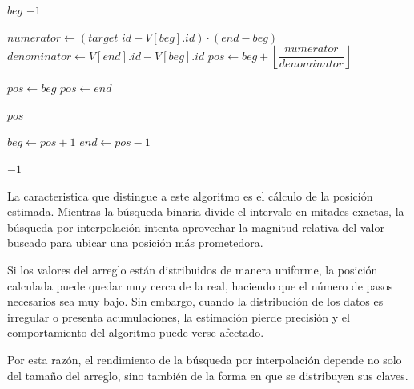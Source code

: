\begin{algorithm}
    \caption{Búsqueda por interpolación $\triangleright$ $V[beg..end]$}
    \begin{algorithmic}[1]


                    \State \Return $beg$
                \EndIf
                \State \Return $-1$
            \EndIf

            \State $numerator \gets (target\_id - V[beg].id) \cdot (end - beg)$
            \State $denominator \gets V[end].id - V[beg].id$
            \State $pos \gets beg + \left\lfloor \dfrac{numerator}{denominator} \right\rfloor$

                \State $pos \gets beg$
                \State $pos \gets end$
            \EndIf

                \State \Return $pos$
            \EndIf

                \State $beg \gets pos + 1$
            \Else
                \State $end \gets pos - 1$
            \EndIf

        \EndWhile

        \State \Return $-1$

        \EndProcedure
    \end{algorithmic}
\end{algorithm}

La caracteristica que distingue a este algoritmo es el cálculo de la posición estimada. Mientras la búsqueda binaria divide el intervalo en mitades exactas, la búsqueda por interpolación intenta aprovechar la magnitud relativa del valor buscado para ubicar una posición más prometedora.

Si los valores del arreglo están distribuidos de manera uniforme, la posición calculada puede quedar muy cerca de la real, haciendo que el número de pasos necesarios sea muy bajo. Sin embargo, cuando la distribución de los datos es irregular o presenta acumulaciones, la estimación pierde precisión y el comportamiento del algoritmo puede verse afectado.

Por esta razón, el rendimiento de la búsqueda por interpolación depende no solo del tamaño del arreglo, sino también de la forma en que se distribuyen sus claves.

